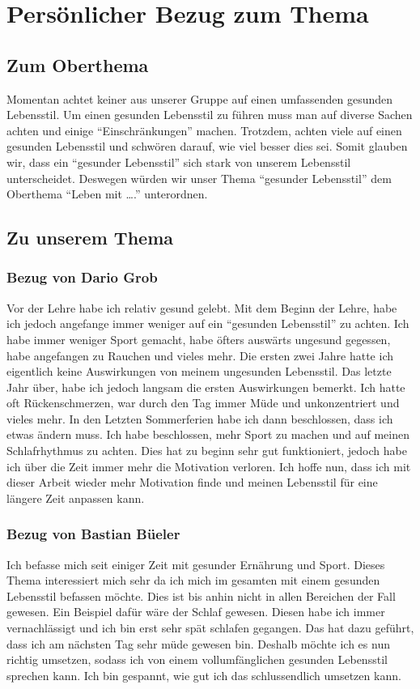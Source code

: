 \chapter{Persönlicher Bezug zum Thema}
\section{Zum Oberthema}
Momentan achtet keiner aus unserer Gruppe auf einen umfassenden gesunden Lebensstil.
Um einen gesunden Lebensstil zu führen muss man auf diverse Sachen achten und einige “Einschränkungen” machen. Trotzdem, achten viele auf einen gesunden Lebensstil und schwören darauf, wie viel besser dies sei. 
Somit glauben wir, dass ein “gesunder Lebensstil” sich stark von unserem Lebensstil unterscheidet. Deswegen würden wir unser Thema “gesunder Lebensstil” dem Oberthema “Leben mit ….” unterordnen.
\section{Zu unserem Thema}
\subsection{Bezug von Dario Grob}
\label{bezug:dario}
Vor der Lehre habe ich relativ gesund gelebt. Mit dem Beginn der Lehre, habe ich jedoch angefange immer weniger auf ein “gesunden Lebensstil” zu achten.
\newline
Ich habe immer weniger Sport gemacht, habe öfters auswärts ungesund gegessen, habe angefangen zu Rauchen und vieles mehr. 
\newline
Die ersten zwei Jahre hatte ich eigentlich keine Auswirkungen von meinem ungesunden Lebensstil. 
\newline
Das letzte Jahr über, habe ich jedoch langsam die ersten Auswirkungen bemerkt. Ich hatte oft Rückenschmerzen, war durch den Tag immer Müde und unkonzentriert und vieles mehr.
\newline
In den Letzten Sommerferien habe ich dann beschlossen, dass ich etwas ändern muss. Ich habe beschlossen, mehr Sport zu machen und auf meinen Schlafrhythmus zu achten. 
\newline
Dies hat zu beginn sehr gut funktioniert, jedoch habe ich über die Zeit immer mehr die Motivation verloren.
\newline
Ich hoffe nun, dass ich mit dieser Arbeit wieder mehr Motivation finde und meinen Lebensstil für eine längere Zeit anpassen kann.
\subsection{Bezug von Bastian Büeler}
Ich befasse mich seit einiger Zeit mit gesunder Ernährung und Sport. Dieses Thema interessiert mich sehr da ich mich im gesamten mit einem gesunden Lebensstil befassen möchte. Dies ist bis anhin nicht in allen Bereichen der Fall gewesen. Ein Beispiel dafür wäre der Schlaf gewesen. Diesen habe ich immer vernachlässigt und ich bin erst sehr spät schlafen gegangen. Das hat dazu geführt, dass ich am nächsten Tag sehr müde gewesen bin. Deshalb möchte ich es nun richtig umsetzen, sodass ich von einem vollumfänglichen gesunden Lebensstil sprechen kann. Ich bin gespannt, wie gut ich das schlussendlich umsetzen kann.
